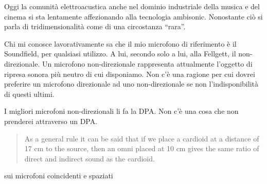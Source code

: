 \documentclass[a4paper,11pt]{article}
\begin{document}
Oggi la comunità elettroacustica anche nel dominio industriale della
musica e del cinema si sta lentamente affezionando alla tecnologia
ambisonic. Nonostante ciò si parla di tridimensionalità come di una
circostanza ``rara''.

Chi mi conosce lavorativamente sa che il mio microfono di riferimento è
il Soundfield, per qualsiasi utilizzo. A lui, secondo solo a lui, alla
Fellgett, il non-direzionale. Un microfono non-direzionale rappresenta
attualmente l'oggetto di ripresa sonora più neutro di cui disponiamo.
Non c'è una ragione per cui dovrei preferire un microfono direzionale ad
uno non-direzionale se non l'indisponibilità di questi ultimi.

I migliori microfoni non-direzionali li fa la DPA. Non c'è una cosa che
non prenderei attraverso un DPA.

\begin{quote}
As a general rule it can be said that if we place a cardioid at a
distance of 17 cm to the source, then an omni placed at 10 cm gives
the same ratio of direct and indirect sound as the cardioid.
\end{quote}

sui microfoni coincidenti e spaziati
\end{document}
